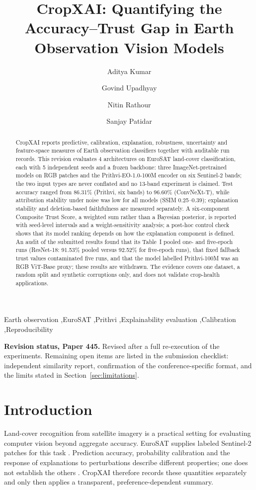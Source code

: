 \documentclass[3p,times,procedia]{elsarticle}
\begin{document}
\begin{frontmatter}
\title{CropXAI: Quantifying the Accuracy--Trust Gap in Earth Observation Vision Models}
\author{Aditya Kumar}\author{Govind Upadhyay}\author{Nitin Rathour}\author{Sanjay Patidar}
\address{Department of Software Engineering, Delhi Technological University, Delhi, India}
\begin{abstract}
CropXAI reports predictive, calibration, explanation, robustness, uncertainty and feature-space measures of Earth observation classifiers together with auditable run records. This revision evaluates 4 architectures on EuroSAT land-cover classification, each with 5 independent seeds and a frozen backbone: three ImageNet-pretrained models on RGB patches and the Prithvi-EO-1.0-100M encoder on six Sentinel-2 bands; the two input types are never conflated and no 13-band experiment is claimed. Test accuracy ranged from 86.31\% (Prithvi, six bands) to 96.60\% (ConvNeXt-T), while attribution stability under noise was low for all models (SSIM 0.25--0.39); explanation stability and deletion-based faithfulness are measured separately. A six-component Composite Trust Score, a weighted sum rather than a Bayesian posterior, is reported with seed-level intervals and a weight-sensitivity analysis; a post-hoc control check shows that its model ranking depends on how the explanation component is defined. An audit of the submitted results found that its Table~I pooled one- and five-epoch runs (ResNet-18: 91.53\% pooled versus 92.52\% for five-epoch runs), that fixed fallback trust values contaminated five runs, and that the model labelled Prithvi-100M was an RGB ViT-Base proxy; these results are withdrawn. The evidence covers one dataset, a random split and synthetic corruptions only, and does not validate crop-health applications.
\end{abstract}
\begin{keyword}Earth observation \sep EuroSAT \sep Prithvi \sep Explainability evaluation \sep Calibration \sep Reproducibility\end{keyword}
\end{frontmatter}

\noindent\textbf{Revision status, Paper 445.} Revised after a full re-execution of the experiments. Remaining open items are listed in the submission checklist: independent similarity report, confirmation of the conference-specific format, and the limits stated in Section~\ref{sec:limitations}.

\section{Introduction}\label{sec:introduction}
Land-cover recognition from satellite imagery is a practical setting for evaluating computer vision beyond aggregate accuracy. EuroSAT supplies labeled Sentinel-2 patches for this task \cite{eurosat}. Prediction accuracy, probability calibration and the response of explanations to perturbations describe different properties; one does not establish the others \cite{calibration,rise}. CropXAI therefore records these quantities separately and only then applies a transparent, preference-dependent summary.
\end{document}
